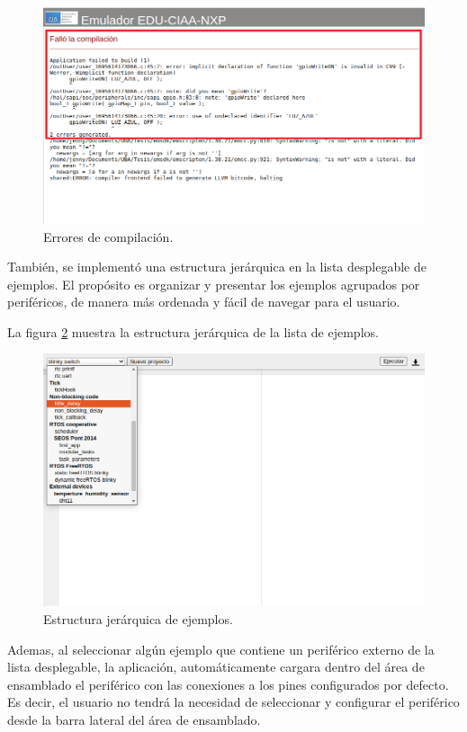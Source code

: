 \begin{figure}[ht]
	\centering
	\includegraphics[scale=.39]{./Figures/PlataformaErrores2.png}
	\caption{Errores de compilación.}
	\label{fig:PlataformaErrores1}
\end{figure}

También, se implementó una estructura jerárquica en la lista desplegable de ejemplos. El propósito es organizar y presentar los ejemplos agrupados por periféricos, de manera más ordenada y fácil de navegar para el usuario.

La figura \ref{fig:listExamples} muestra la estructura jerárquica de la lista de ejemplos.

\begin{figure}[ht]
	\centering
	\includegraphics[scale=.42]{./Figures/listExamples.jpg}
	\caption{Estructura jerárquica de ejemplos. }
	\label{fig:listExamples}
\end{figure}

Ademas, al seleccionar algún ejemplo que contiene un periférico externo de la lista desplegable, la aplicación, automáticamente cargara dentro del área de ensamblado el periférico con las conexiones a los pines configurados por defecto. Es decir, el usuario no tendrá la necesidad de seleccionar y configurar el periférico desde la barra lateral del área de ensamblado.


